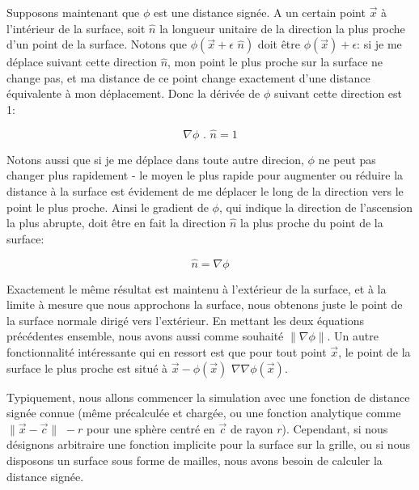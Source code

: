 \documentclass[11pt]{report}
\begin{document}
Supposons maintenant que $\phi$ est une distance signée. A un certain point $\overrightarrow{x}$ à l'intérieur de la surface, soit $\hat{n}$ la longueur unitaire de la direction la plus proche d'un point de la surface. Notons que $\phi (\overrightarrow{x} + \epsilon\,\,\hat{n})$ doit être $\phi (\overrightarrow{x}) + \epsilon$: si je me déplace suivant cette direction $\hat{n}$, mon point le plus proche sur la surface ne change pas, et ma distance de ce point change exactement d'une distance équivalente à mon déplacement. Donc la dérivée de $\phi$ suivant cette direction est 1:

\begin{equation}
\nabla \phi \,\,.\,\, \hat{n} = 1
\end{equation}

Notons aussi que si je me déplace dans toute autre direcion, $\phi$ ne peut pas changer plus rapidement - le moyen le plus rapide pour augmenter ou réduire la distance  à la surface est évidement de me déplacer le long de la direction vers le point le plus proche. Ainsi le gradient  de $\phi$, qui indique la direction de l'ascension la plus abrupte, doit être en fait la direction  $\hat{n}$ la plus proche du point de la surface:

\begin{equation}
\hat{n} = \nabla \phi
\end{equation}

Exactement le même résultat est maintenu à l'extérieur de la surface, et à la limite à mesure que nous approchons la surface, nous obtenons juste le point de la surface normale dirigé vers l'extérieur. En mettant les deux équations précédentes ensemble, nous avons aussi comme souhaité $\| \nabla \phi \|$. Un autre fonctionnalité intéressante qui en ressort est que pour tout point $\overrightarrow{x}$, le point de la surface le plus proche est situé à $\overrightarrow{x} - \phi (\overrightarrow{x})\,\, \nabla \nabla \phi (\overrightarrow{x})$. \newline

Typiquement, nous allons commencer la simulation avec une fonction de distance signée connue (même précalculée et chargée, ou une fonction analytique comme $\| \overrightarrow{x} - \overrightarrow{c} \| \,\, - r$ pour une sphère centré en $\overrightarrow{c}$ de rayon $r$). Cependant, si nous désignons arbitraire une fonction implicite pour la surface sur la grille, ou si nous disposons un surface sous forme de mailles, nous avons besoin de calculer la distance signée.
\end{document}
